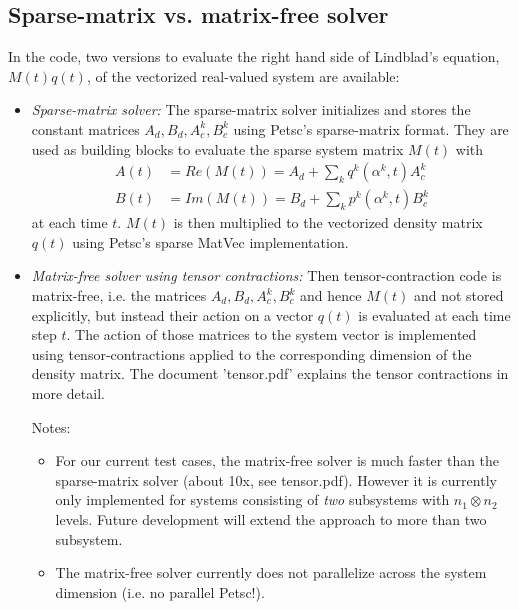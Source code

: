 \documentclass[letterpaper]{article}
\begin{document}
   \subsection{Sparse-matrix vs. matrix-free solver}

   In the code, two versions to evaluate the right hand side of Lindblad's
   equation, $M(t)q(t)$, of the vectorized real-valued system are available:
   \begin{itemize}
     \item \textit{Sparse-matrix solver:}
      The sparse-matrix solver initializes and stores the constant matrices
       $A_d,B_d, A_c^k, B_c^k$ using Petsc's sparse-matrix format. They are used
       as building blocks to evaluate the sparse system matrix $M(t)$ with 
     \begin{align}
       A(t) &= Re(M(t)) = A_d + \sum_kq^k(\alpha^k, t)A_c^k \\
       B(t) &= Im(M(t)) = B_d + \sum_k p^k(\alpha^k, t)B_c^k
     \end{align}
   at each time $t$. $M(t)$ is then multiplied to the vectorized density matrix
       $q(t)$ using Petsc's sparse MatVec implementation. 

   \item \textit{Matrix-free solver using tensor contractions:}
     Then tensor-contraction code is matrix-free, i.e. the matrices $A_d,B_d,
       A_c^k, B_c^k$ and hence $M(t)$ and not stored explicitly, but instead
       their action on a vector $q(t)$ is evaluated at each time step $t$. The
       action of those matrices to the system vector is implemented using
       tensor-contractions applied to the corresponding dimension of the density
       matrix. The document 'tensor.pdf' explains the tensor contractions in
       more detail. 

     Notes:
     \begin{itemize}
       \item For our current test cases, the matrix-free solver is much faster
         than the sparse-matrix solver (about 10x, see tensor.pdf). However it
         is currently only implemented for systems consisting of \textit{two}
         subsystems with $n_1 \otimes n_2$ levels. Future development will
         extend the approach to more than two subsystem. 
       \item The matrix-free solver currently does not parallelize across the
         system dimension (i.e. no parallel Petsc!).
     \end{itemize}


   \end{itemize}
\end{document}
